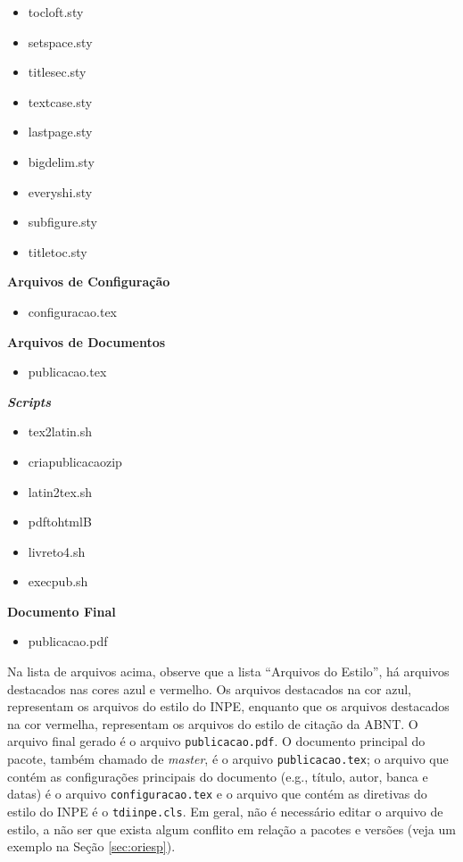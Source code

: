 \begin{multicols}{2}
\begin{itemize}
		\item tocloft.sty   
        \item setspace.sty
		\item titlesec.sty   
        \item textcase.sty
		\item lastpage.sty     
        \item bigdelim.sty
		\item everyshi.sty 
        \item subfigure.sty
		\item titletoc.sty
	\end{itemize}
	\textbf{Arquivos de Configuração}
	\begin{itemize}
		\item configuracao.tex
	\end{itemize}
    \textbf{Arquivos de Documentos}
    \begin{itemize}
        \item publicacao.tex
    \end{itemize}
    \textbf{\textit{Scripts}}
    \begin{itemize}
        \item tex2latin.sh
        \item criapublicacaozip
        \item latin2tex.sh
        \item pdftohtmlB
        \item livreto4.sh
        \item execpub.sh
    \end{itemize}
    \textbf{Documento Final}
    \begin{itemize}
        \item publicacao.pdf
    \end{itemize}
\end{multicols}

Na lista de arquivos acima, observe que a lista ``Arquivos do Estilo'', há arquivos destacados nas cores azul e vermelho. Os arquivos destacados na cor azul, representam os arquivos do estilo do INPE, enquanto que os arquivos destacados na cor vermelha, representam os arquivos do estilo de citação da ABNT. O arquivo final gerado é o arquivo {\tt publicacao.pdf}. O documento principal do pacote, também chamado de \textit{master}, é o arquivo {\tt publicacao.tex}; o arquivo que contém as configurações principais do documento (e.g., título, autor, banca e datas) é o arquivo {\tt configuracao.tex} e o arquivo que contém as diretivas do estilo do INPE é o {\tt tdiinpe.cls}. Em geral, não é necessário editar o arquivo de estilo, a não ser que exista algum conflito em relação a pacotes e versões (veja um exemplo na Seção \ref{sec:oriesp}). 

